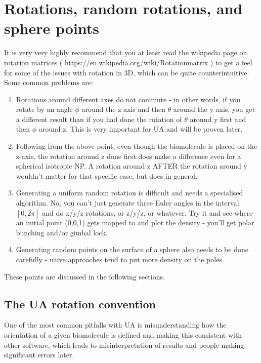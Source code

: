 \documentclass[10pt,a4paper,onecolumn]{report}
\begin{document}
\appendix
\chapter{Rotations, random rotations, and sphere points}
 It is very very highly recommend that you at least read the wikipedia page on rotation matrices ( https:\slash \slash en.wikipedia.org\slash wiki\slash Rotation\textunderscore matrix ) to get a feel for some of the issues with rotation in 3D, which can be quite counterintuitive. Some common problems are:
\begin{enumerate}
\item Rotations around different axes do not commute - in other words, if you rotate by an angle $\phi$ around the z axis and then $\theta$ around the y axis, you get a different result than if you had done the rotation of $\theta$ around y first and then $\phi$ around z. This is very important for UA and will be proven later. 
\item Following from the above point, even though the biomolecule is placed on the z-axis, the rotation around z done first does make a difference even for a spherical isotropic NP. A rotation around z AFTER the rotation around y wouldn't matter for that specific case, but does in general. 
\item Generating a uniform random rotation is difficult and needs a specialised algorithm. No, you can't just generate three Euler angles in the interval $[0,2\pi]$ and do x/y/z rotations, or z/y/z, or whatever. Try it and see where an initial point (0,0,1) gets mapped to and plot the density - you'll get polar bunching and/or gimbal lock. 
\item Generating random points on the surface of a sphere also needs to be done carefully - naive approaches tend to put more density on the poles.
\end{enumerate}
These points are discussed in the following sections.

\section{The UA rotation convention} \label{section:uarotations}
One of the most common pitfalls with UA is misunderstanding how the orientation of a given biomolecule is defined and making this consistent with other software, which leads to misinterpretation of results and people making significant errors later. 
\end{document}
